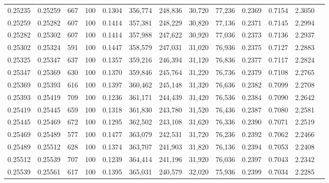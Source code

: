 \begin{tabular}{rrrrrrrrrrrrr}
0.25235 & 0.25259 &   667 & 100 &                                     0.1304 & 356,774 & 248,836 &  30,720 &  77,236 & 0.2369 & 0.7154 & 2.3050 \\
0.25259 & 0.25282 &   607 & 100 &                                     0.1414 & 357,381 & 248,229 &  30,820 &  77,136 & 0.2371 & 0.7145 & 2.2994 \\
0.25282 & 0.25302 &   607 & 100 &                                     0.1414 & 357,988 & 247,622 &  30,920 &  77,036 & 0.2373 & 0.7136 & 2.2937 \\
0.25302 & 0.25324 &   591 & 100 &                                     0.1447 & 358,579 & 247,031 &  31,020 &  76,936 & 0.2375 & 0.7127 & 2.2883 \\
0.25325 & 0.25347 &   637 & 100 &                                     0.1357 & 359,216 & 246,394 &  31,120 &  76,836 & 0.2377 & 0.7117 & 2.2824 \\
0.25347 & 0.25369 &   630 & 100 &                                     0.1370 & 359,846 & 245,764 &  31,220 &  76,736 & 0.2379 & 0.7108 & 2.2765 \\
0.25369 & 0.25393 &   616 & 100 &                                     0.1397 & 360,462 & 245,148 &  31,320 &  76,636 & 0.2382 & 0.7099 & 2.2708 \\
0.25393 & 0.25419 &   709 & 100 &                                     0.1236 & 361,171 & 244,439 &  31,420 &  76,536 & 0.2384 & 0.7090 & 2.2642 \\
0.25419 & 0.25445 &   659 & 100 &                                     0.1318 & 361,830 & 243,780 &  31,520 &  76,436 & 0.2387 & 0.7080 & 2.2581 \\
0.25445 & 0.25469 &   672 & 100 &                                     0.1295 & 362,502 & 243,108 &  31,620 &  76,336 & 0.2390 & 0.7071 & 2.2519 \\
0.25469 & 0.25489 &   577 & 100 &                                     0.1477 & 363,079 & 242,531 &  31,720 &  76,236 & 0.2392 & 0.7062 & 2.2466 \\
0.25489 & 0.25512 &   628 & 100 &                                     0.1374 & 363,707 & 241,903 &  31,820 &  76,136 & 0.2394 & 0.7053 & 2.2408 \\
0.25512 & 0.25539 &   707 & 100 &                                     0.1239 & 364,414 & 241,196 &  31,920 &  76,036 & 0.2397 & 0.7043 & 2.2342 \\
0.25539 & 0.25561 &   617 & 100 &                                     0.1395 & 365,031 & 240,579 &  32,020 &  75,936 & 0.2399 & 0.7034 & 2.2285 \\

\end{tabular}
